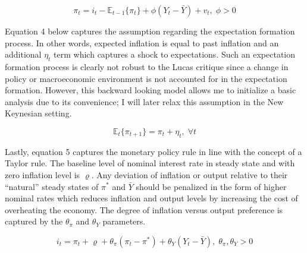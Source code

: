 \documentclass[12pt]{article}
\newcommand{\1}{\mathbbm 1}
\renewcommand{\rho}{\varrho}
\begin{document}
		
		
		\begin{equation}
			\pi_{t} = i_{t} - \mathbb{E}_{t-1}\{\pi_{t}\} + \phi(Y_{t} - \bar{Y}) + v_{t}, \; \phi > 0
		\end{equation}
		
		Equation 4 below captures the assumption regarding the expectation formation process. In other words, expected inflation is equal to past inflation and an additional $\eta_{t}$ term which captures a shock to expectations. Such an expectation formation process is clearly not robust to the Lucas critique since a change in policy or macroeconomic environment is not accounted for in the expectation formation. However, this backward looking model allows me to initialize a basic analysis due to its convenience; I will later relax this assumption in the New Keynesian setting.
		
		
		
		
		
		
		
		
		
		
		
		
		\begin{equation}
			\mathbb{E}_{t}\{\pi_{t+1}\} = \pi_{t} + \eta_{t}, \; \forall t
		\end{equation}
	
	Lastly, equation 5 captures the monetary policy rule in line with the concept of a Taylor rule. The baseline level of nominal interest rate in steady state and with zero inflation level is $\rho$. Any deviation of inflation or output relative to their ``natural'' steady states of $\pi^{*}$ and $\bar{Y}$ should be penalized in the form of higher nominal rates which reduces inflation and output levels by increasing the cost of overheating the economy. The degree of inflation versus output preference is captured by the $\theta_{\pi}$ and $\theta_{Y}$ parameters. 
	
	
	\begin{equation}
		i_{t} = \pi_{t} + \rho + \theta_{\pi} (\pi_{t} - \pi^{*}) + \theta_{Y} (Y_{t} - \bar{Y}), \; \theta_{\pi}, \theta_{Y} > 0
	\end{equation}


\end{document}
